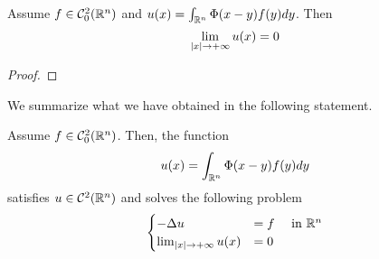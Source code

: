


\begin{ThBox}
    \begin{Th}
        Assume $f \in \mathcal{C}^2 _0(\mathbb{R}^n)$ and $u(x)= \int_{\mathbb{R}^n }\Phi (x-y)f(y) dy$. Then
        \begin{equation*}
        \lim_{|x| \rightarrow +\infty} u(x) = 0
        \end{equation*}
    \end{Th}
\end{ThBox}
\begin{ProofBox}
    \begin{proof}
        
    \end{proof}
\end{ProofBox}
We summarize what we have obtained in the following statement.
\begin{PropBox}
    \begin{Cor}
        Assume $f \in \mathcal{C}^2_0(\mathbb{R}^n)$. Then, the function
        \begin{equation*}
            u(x)=\int_{\mathbb{R}^n} \Phi(x-y)f(y) dy 
        \end{equation*}
        satisfies $u \in \mathcal{C}^2(\mathbb{R}^n)$ and solves the following problem
        \begin{equation*}
            \begin{cases}
                -\Delta u &= f \quad \text{ in } \mathbb{R}^n\\
                \lim_{|x| \rightarrow +\infty} u(x) &= 0
            \end{cases}
        \end{equation*}
    \end{Cor}
\end{PropBox}
